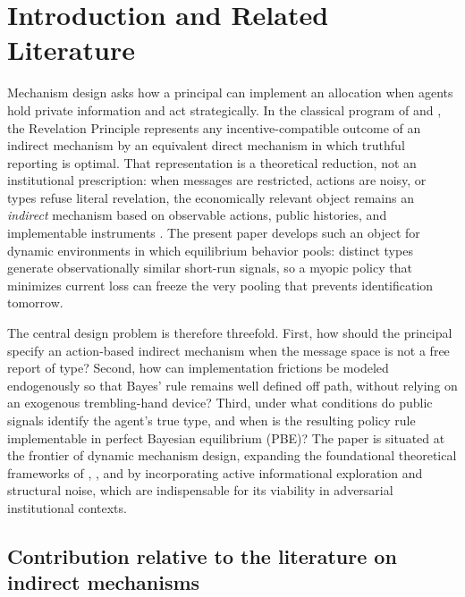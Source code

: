 \documentclass[review,authoryear,12pt]{elsarticle}
\theoremstyle{plain}
\theoremstyle{definition}
\newcommand{\1}{\mathbf{1}}
\begin{document}
\section{Introduction and Related Literature}\label{sec:intro}

Mechanism design asks how a principal can implement an allocation when agents hold private information and act strategically. In the classical program of \citet{Gibbard1973} and \citet{Myerson1979IC,Myerson1981}, the Revelation Principle represents any incentive-compatible outcome of an indirect mechanism by an equivalent direct mechanism in which truthful reporting is optimal. That representation is a theoretical reduction, not an institutional prescription: when messages are restricted, actions are noisy, or types refuse literal revelation, the economically relevant object remains an \emph{indirect} mechanism based on observable actions, public histories, and implementable instruments \citep{Jackson2001,BergemannMorris2012}. The present paper develops such an object for dynamic environments in which equilibrium behavior pools: distinct types generate observationally similar short-run signals, so a myopic policy that minimizes current loss can freeze the very pooling that prevents identification tomorrow.

The central design problem is therefore threefold. First, how should the principal specify an action-based indirect mechanism when the message space is not a free report of type? Second, how can implementation frictions be modeled endogenously so that Bayes' rule remains well defined off path, without relying on an exogenous trembling-hand device? Third, under what conditions do public signals identify the agent's true type, and when is the resulting policy rule implementable in perfect Bayesian equilibrium (PBE)? The paper is situated at the frontier of dynamic mechanism design, expanding the foundational theoretical frameworks of \citet{CourtyLi2000}, \citet{EsoSzentes2007}, and \citet{PavanSegalToikka2014} by incorporating active informational exploration and structural noise, which are indispensable for its viability in adversarial institutional contexts.

\subsection{Contribution relative to the literature on indirect mechanisms}\label{subsec:framing}
\end{document}
